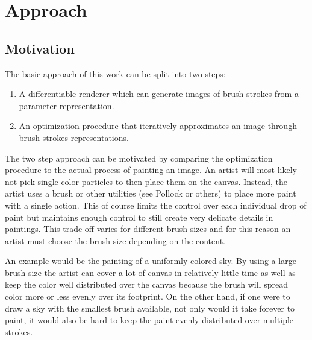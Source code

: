 \setchapterpreamble[u]{\margintoc}
\chapter{Approach}


\section{Motivation}


The basic approach of this work can be split into two steps:
\begin{enumerate}
    \item A differentiable renderer which can generate images of brush strokes from a parameter representation.
    \item An optimization procedure that iteratively approximates an image through brush strokes representations.
\end{enumerate}

The two step approach can be motivated by comparing the optimization procedure to the
actual process of painting an image.
An artist will most likely not pick single color particles to then place them on
the canvas.
Instead, the artist uses a brush or other utilities (see Pollock or others) to place
more paint with a single action.
This of course limits the control over each individual drop of paint but maintains
enough control to still create very delicate details in paintings.
This trade-off varies for different brush sizes and for this reason an artist must
choose the brush size depending on the content.

An example would be the painting of a uniformly colored sky.
By using a large brush size the artist can cover a lot of canvas in relatively little
time as well as keep the color well distributed over the canvas because the brush
will spread color more or less evenly over its footprint.
On the other hand, if one were to draw a sky with the smallest brush available,
not only would it take forever to paint, it would also be hard to keep the paint
evenly distributed over multiple strokes.

